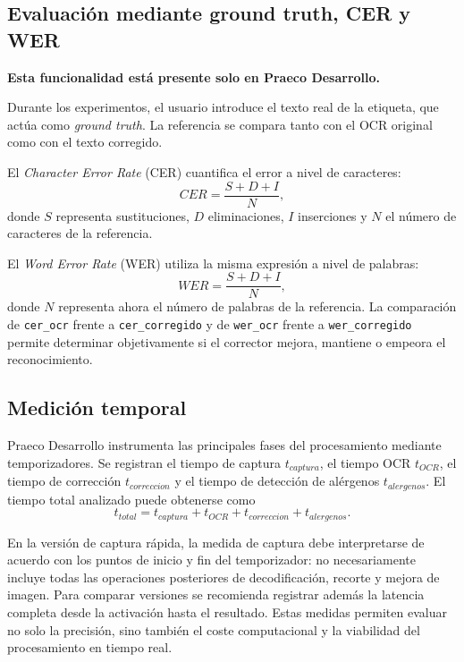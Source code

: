 \subsection{Evaluación mediante ground truth, CER y WER}

\textbf{Esta funcionalidad está presente solo en Praeco Desarrollo.}

 Durante los experimentos, el usuario introduce el texto real de la etiqueta, que actúa como \textit{ground truth}. La referencia se compara tanto con el OCR original como con el texto corregido.

El \textit{Character Error Rate} (CER) cuantifica el error a nivel de caracteres:
\begin{equation}
	CER=\frac{S+D+I}{N},
\end{equation}
donde $S$ representa sustituciones, $D$ eliminaciones, $I$ inserciones y $N$ el número de caracteres de la referencia.

\medskip

El \textit{Word Error Rate} (WER) utiliza la misma expresión a nivel de palabras:
\begin{equation}
	WER=\frac{S+D+I}{N},
\end{equation}
donde $N$ representa ahora el número de palabras de la referencia. La comparación de \texttt{cer\_ocr} frente a \texttt{cer\_corregido} y de \texttt{wer\_ocr} frente a \texttt{wer\_corregido} permite determinar objetivamente si el corrector mejora, mantiene o empeora el reconocimiento.

\subsection{Medición temporal}

Praeco Desarrollo instrumenta las principales fases del procesamiento mediante temporizadores. Se registran el tiempo de captura $t_{captura}$, el tiempo OCR $t_{OCR}$, el tiempo de corrección $t_{correccion}$ y el tiempo de detección de alérgenos $t_{alergenos}$. El tiempo total analizado puede obtenerse como
\begin{equation}
	t_{total}=t_{captura}+t_{OCR}+t_{correccion}+t_{alergenos}.
\end{equation}

En la versión de captura rápida, la medida de captura debe interpretarse de acuerdo con los puntos de inicio y fin del temporizador: no necesariamente incluye todas las operaciones posteriores de decodificación, recorte y mejora de imagen. Para comparar versiones se recomienda registrar además la latencia completa desde la activación hasta el resultado. Estas medidas permiten evaluar no solo la precisión, sino también el coste computacional y la viabilidad del procesamiento en tiempo real.

